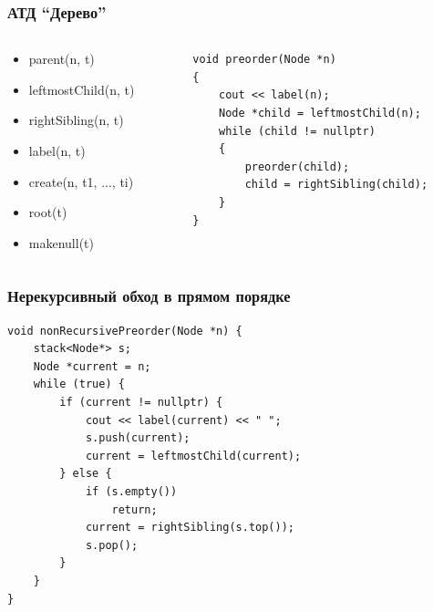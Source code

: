\documentclass[xetex,mathserif,serif]{beamer}
\begin{document}
	\begin{frame}[fragile]
		\frametitle{АТД ``Дерево''}
		\begin{columns}
			\begin{column}{0.5\textwidth}
				\begin{itemize}
					\item parent(n, t)
					\item leftmostChild(n, t)
					\item rightSibling(n, t)
					\item label(n, t)
					\item create(n, t1, ..., ti)
					\item root(t)
					\item makenull(t)
				\end{itemize}
			\end{column}
			\begin{column}{0.5\textwidth}
				\begin{verbatim}
void preorder(Node *n)
{
    cout << label(n);
    Node *child = leftmostChild(n);
    while (child != nullptr)
    {
        preorder(child);
        child = rightSibling(child);
    }
}
				\end{verbatim}
			\end{column}
		\end{columns}
	\end{frame}

	\begin{frame}[fragile]
		\frametitle{Нерекурсивный обход в прямом порядке}
		\begin{small}
			\begin{verbatim}
void nonRecursivePreorder(Node *n) {
    stack<Node*> s;
    Node *current = n;
    while (true) {
        if (current != nullptr) {
            cout << label(current) << " ";
            s.push(current);
            current = leftmostChild(current);
        } else {
            if (s.empty())
                return;
            current = rightSibling(s.top());
            s.pop();
        }
    }
}
			\end{verbatim}
		\end{small}
	\end{frame}
\end{document}
